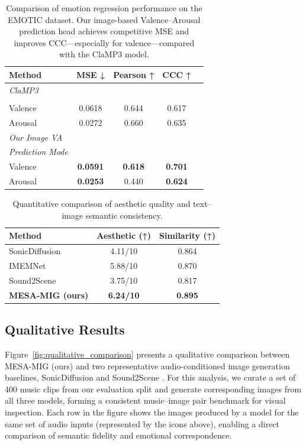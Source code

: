 \documentclass[letterpaper]{article}
\begin{document}
\begin{table}[t]
\centering
\small
\setlength{\tabcolsep}{6pt}
\begin{tabular}{lcccc}
\toprule
\textbf{Method} & \textbf{MSE ↓} & \textbf{Pearson ↑} & \textbf{CCC ↑} \\
\midrule
\multicolumn{4}{l}{\textit{ClaMP3} } \\
\cite{wu2025clamp3}\\
Valence & 0.0618 & 0.644 & 0.617 \\
Arousal & 0.0272 & 0.660 & 0.635 \\
\midrule
\multicolumn{4}{l}{\textit{Our Image VA}} \\
\textit{Prediction Mode}\\
Valence & \textbf{0.0591} & \textbf{0.618} & \textbf{0.701} \\
Arousal & \textbf{0.0253} & 0.440 & \textbf{0.624} \\
\bottomrule
\end{tabular}
\caption{
Comparison of emotion regression performance on the EMOTIC dataset.
Our image-based Valence–Arousal prediction head achieves competitive MSE
and improves CCC—especially for valence—compared with the ClaMP3 model.
}
\label{tab:emotic_va_compare}
\end{table}
\begin{table}[t]
\centering
\small     
\setlength{\tabcolsep}{5pt} 
\begin{tabular}{lcc}
\toprule
\textbf{Method} & \textbf{Aesthetic (↑)} & \textbf{Similarity (↑)} \\
\midrule
SonicDiffusion & 4.11/10 & 0.864 \\
IMEMNet        & 5.88/10 & 0.870 \\
Sound2Scene    & 3.75/10 & 0.817 \\
\textbf{MESA-MIG (ours)} & \textbf{6.24/10} & \textbf{0.895} \\
\bottomrule
\end{tabular}
\caption{
Quantitative comparison of aesthetic quality and text–image semantic consistency.
}
\label{tab:aes_sim}
\end{table}

\subsection{Qualitative Results}

Figure~\ref{fig:qualitative_comparison} presents a qualitative comparison between MESA-MIG (ours) and two representative audio-conditioned image generation baselines, SonicDiffusion\cite{biner2024sonicdiffusion} and Sound2Scene \cite{kim2023sound2scene}. For this analysis, we curate a set of 400 music clips from our evaluation split and generate corresponding images from all three models, forming a consistent music–image pair benchmark for visual inspection. Each row in the figure shows the images produced by a model for the same set of audio inputs (represented by the icons above), enabling a direct comparison of semantic fidelity and emotional correspondence.
\end{document}

